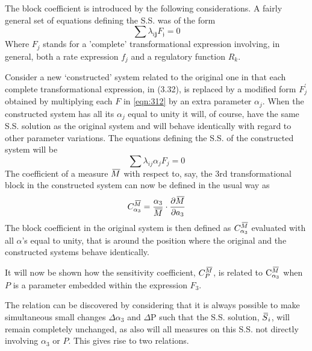 The block coefficient is introduced by the following considerations. A fairly general set of equations defining the S.S. was of the form
%
\begin{equation}
\sum \lambda_{i \mathbf{j}} F_{\mathfrak{j}}=0
\label{eqn:312}
\end{equation}
%
Where $F_{j}$ stands for a 'complete' transformational expression involving, in general, both a rate expression $f_{j}$ and a regulatory function $R_{k}$.

Consider a new `constructed' system related to the original one in that each complete transformational expression, in (3.32), is replaced by a modified form $F^{\prime}_j$ obtained by multiplying each $F$ in \eqref{eqn:312}  by an extra parameter $\alpha_{j}$. When the constructed system has all its $\alpha_{j}$ equal to unity it will, of course, have the same S.S. solution as the original system and will behave identically with regard to other parameter variations. The equations defining the S.S. of the constructed system will be
%
\begin{equation}
\sum \lambda_{ij} \alpha_{j} F_{j}=0
\label{eqn:313}
\end{equation}
%
The coefficient of a measure $\,\overline{\!{M}}$ with respect to, say, the 3rd transformational block in the constructed system can now be defined in the usual way as
%
\begin{equation}
C_{\alpha_{3}}^{\,\overline{\!{M}}}=\frac{\alpha_{3}}{\,\overline{\!{M}}} \cdot \frac{\partial \,\overline{\!{M}}}{\partial a_{3}}
\label{eqn:314}
\end{equation}
%
The block coefficient in the original system is then defined as $C^{\,\overline{\!{M}}}_{\alpha_3}$ evaluated with all $\alpha$'s equal to unity, that is around the position where the original and the constructed systems behave identically.

It will now be shown how the sensitivity coefficient, $C_{P}^{\,\overline{\!{M}}}$, is related to $\mathrm{C}_{\alpha_{3}}^{\,\overline{\!{M}}}$ when $P$ is a parameter embedded within the expression $F_{3}$.

The relation can be discovered by considering that it is always possible to make simultaneous small changes $\Delta \alpha_{3}$ and $\Delta \mathrm{P}$ such that the S.S. solution, $\,\overline{\!{S}}_{i}$, will remain completely unchanged, as also will all measures on this S.S. not directly involving $\alpha_{3}$ or $P$. This gives rise to two relations.


